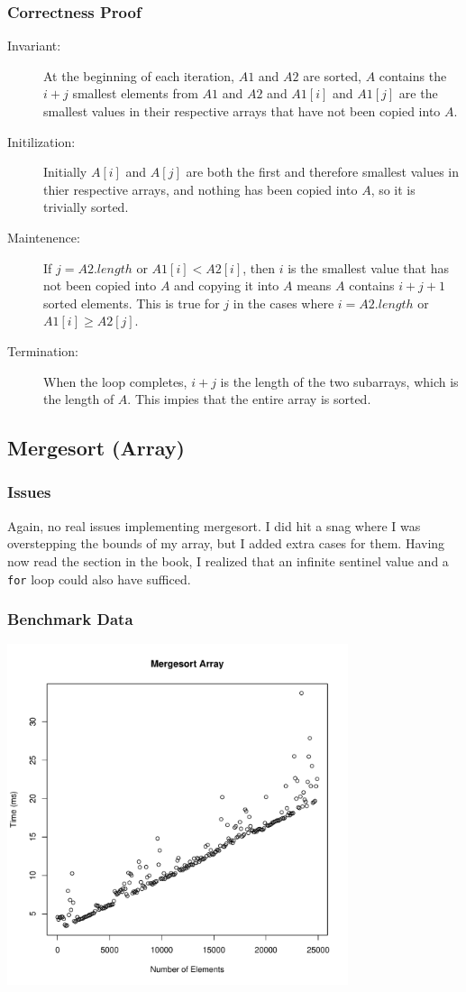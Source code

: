 \documentclass[a4paper,12pt]{article}
\begin{document}
\subsubsection{Correctness Proof}
\begin{description}
\item [Invariant: ] At the beginning of each iteration, $A1$ and $A2$ are sorted, $A$ contains the $i + j$ smallest elements
  from $A1$ and $A2$ and $A1[i]$ and $A1[j]$ are the smallest values in their respective arrays that have not been copied into $A$.
\item [Initilization: ] Initially $A[i]$ and $A[j]$ are both the first and therefore smallest values in thier respective arrays, and nothing has been
  copied into $A$, so it is trivially sorted.
\item [Maintenence: ] If $j = A2.length$ or $A1[i] < A2[i]$, then $i$ is the smallest value that has not been copied into $A$ and copying it into
  $A$ means $A$ contains $i + j + 1$ sorted elements. This is true for $j$ in the cases where $i = A2.length$ or $A1[i] \geq A2[j]$.
\item [Termination: ] When the loop completes, $i + j$ is the length of the two subarrays, which is the length of $A$. This impies that the entire array is sorted.
\end{description}
\subsection{Mergesort (Array)}
\subsubsection{Issues}
Again, no real issues implementing mergesort. I did hit a snag where I was overstepping the bounds of my array, but I added extra cases for them. Having
now read the section in the book, I realized that an infinite sentinel value and a \texttt{for} loop could also have sufficed.
\subsubsection{Benchmark Data}
\includegraphics[height=10cm]{mergesort_array}
\end{document}
